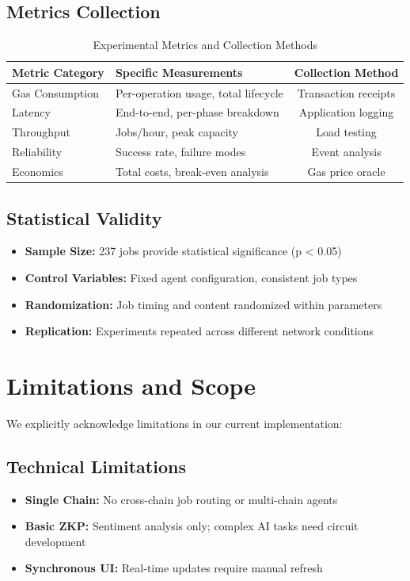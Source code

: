 \subsection{Metrics Collection}
\begin{table}[h]
\centering
\caption{Experimental Metrics and Collection Methods}
\label{tab:metrics}
\begin{tabular}{llc}
\toprule
\textbf{Metric Category} & \textbf{Specific Measurements} & \textbf{Collection Method} \\
\midrule
Gas Consumption & Per-operation usage, total lifecycle & Transaction receipts \\
Latency & End-to-end, per-phase breakdown & Application logging \\
Throughput & Jobs/hour, peak capacity & Load testing \\
Reliability & Success rate, failure modes & Event analysis \\
Economics & Total costs, break-even analysis & Gas price oracle \\
\bottomrule
\end{tabular}
\end{table}

\subsection{Statistical Validity}
\begin{itemize}
    \item \textbf{Sample Size:} 237 jobs provide statistical significance (p < 0.05)
    \item \textbf{Control Variables:} Fixed agent configuration, consistent job types
    \item \textbf{Randomization:} Job timing and content randomized within parameters
    \item \textbf{Replication:} Experiments repeated across different network conditions
\end{itemize}

\section{Limitations and Scope}

We explicitly acknowledge limitations in our current implementation:

\subsection{Technical Limitations}
\begin{itemize}
    \item \textbf{Single Chain:} No cross-chain job routing or multi-chain agents
    \item \textbf{Basic ZKP:} Sentiment analysis only; complex AI tasks need circuit development
    \item \textbf{Synchronous UI:} Real-time updates require manual refresh
\end{itemize}

